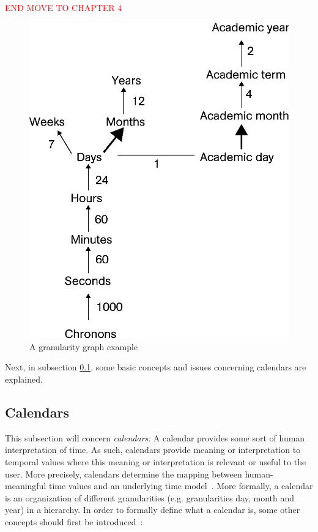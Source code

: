 \textcolor{red}{END MOVE TO CHAPTER 4}

\begin{figure}
\centering
\includegraphics[scale=0.5]{graphs/granularityGraph.eps}
\caption{A granularity graph example}
\label{fig:granularity-graph-example}
\end{figure}


Next, in subsection \ref{subsec:timedomain-calendar}, some basic concepts and issues concerning calendars are explained.

\subsection{Calendars}
\label{subsec:timedomain-calendar}

This subsection will concern \emph{calendars}. A calendar provides some sort of human interpretation of time. As such, calendars provide meaning or interpretation to temporal values where this meaning or interpretation is relevant or useful to the user. More precisely, calendars determine the mapping between human-meaningful time values and an underlying time model~\cite{Dyreson1994}. More formally, a calendar is an organization of different granularities (e.g. granularities day, month and year) in a hierarchy. In order to formally define what a calendar is, some other concepts should first be introduced~\cite{Kraus1997}:


